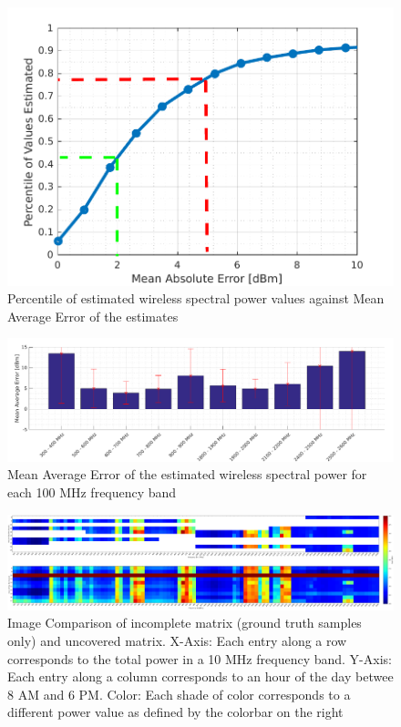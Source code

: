  \begin{figure}[!t]
 \centering
 \includegraphics[width=\textwidth]{spectrum/mae_plot.pdf}
 \caption{Percentile of estimated wireless spectral power values against Mean Average Error of the estimates}
 \label{fig:mae_plot}
 \end{figure}
 
 \begin{figure}[!t]
 \centering
 \includegraphics[width=\textwidth]{spectrum/freq_bin_plot.pdf}
 \caption{Mean Average Error of the estimated wireless spectral power for each 100 MHz frequency band}
 \label{fig:freq_bin_plot}
 \end{figure}

 \begin{figure}[!t]
 \centering
 \includegraphics[width=\textwidth]{spectrum/comparison_image.pdf}
 \caption{Image Comparison of incomplete matrix (ground truth samples only) and uncovered matrix. X-Axis: Each entry along a row corresponds to the total power in a 10 MHz frequency band. Y-Axis: Each entry along a column corresponds to an hour of the day betwee 8 AM and 6 PM. Color: Each shade of color corresponds to a different power value as defined by the colorbar on the right}
 \label{fig:comparison_image}
 \end{figure}


